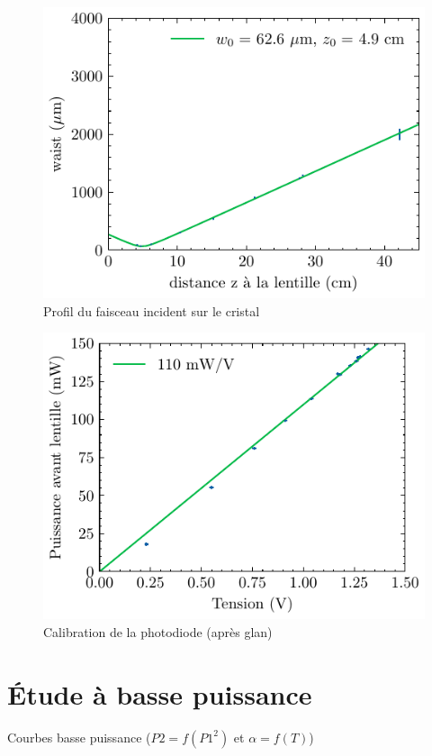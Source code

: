 \documentclass[11pt,a4paper]{article}
\begin{document}
\begin{figure}[h]
    \centering
    \includegraphics{../donnees/waist faisceau incident.pdf}
    \caption{Profil du faisceau incident sur le cristal}
\end{figure}

\begin{figure}[h]
    \centering
    \includegraphics{../donnees/calib photodiode.pdf}
    \caption{Calibration de la photodiode (après glan)}
\end{figure}


\section{Étude à basse puissance}
Courbes basse puissance ($P2=f(P1^2)$ et $\alpha = f(T)$)
\end{document}
